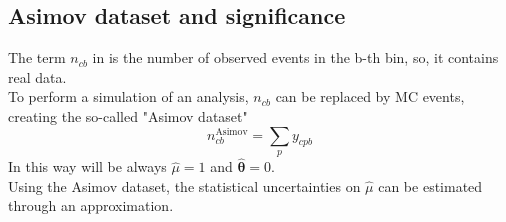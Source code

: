\subsection{Asimov dataset and significance} The term $n_{cb}$ in  is the number of observed events in the b-th bin, so, it contains real data.\\
To perform a simulation of an analysis, $n_{cb}$ can be replaced by MC events, creating the so-called "Asimov dataset" \cite{Cowan2011AsymptoticPhysics}
\begin{equation}
    n_{cb}^{\text{Asimov}}=\sum_p y_{cpb}
\end{equation}
In this way will be always $\hat{\mu}=1$ and $\bm{\hat{\theta}}=0$.\\
Using the Asimov dataset, the statistical uncertainties on $\hat{\mu}$ can be estimated through an approximation.

